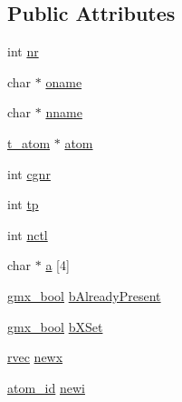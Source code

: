 \subsection*{\-Public \-Attributes}
\begin{DoxyCompactItemize}
\item 
int \hyperlink{structt__hack_ae8f9f581cfadd27c1c080470db018f08}{nr}
\item 
char $\ast$ \hyperlink{structt__hack_a2cfd4426507fdf36e0f859c3df023d4c}{oname}
\item 
char $\ast$ \hyperlink{structt__hack_a13142d44b982065f0551ee7bf6a5d6e0}{nname}
\item 
\hyperlink{structt__atom}{t\-\_\-atom} $\ast$ \hyperlink{structt__hack_a33e8bdc90cfa045a4d2c3814199b2d03}{atom}
\item 
int \hyperlink{structt__hack_a4368826e977f7724de088e1565f964e4}{cgnr}
\item 
int \hyperlink{structt__hack_a9505443c1e18327c6b2d7fa6fa2fec54}{tp}
\item 
int \hyperlink{structt__hack_ab59b7ca3a452b2557b4c95213f651b32}{nctl}
\item 
char $\ast$ \hyperlink{structt__hack_afce8a172eedc721f7a12b837e6416b10}{a} \mbox{[}4\mbox{]}
\item 
\hyperlink{include_2types_2simple_8h_a8fddad319f226e856400d190198d5151}{gmx\-\_\-bool} \hyperlink{structt__hack_a7d98cf2a2e0ca843f3aa9baba6348212}{b\-Already\-Present}
\item 
\hyperlink{include_2types_2simple_8h_a8fddad319f226e856400d190198d5151}{gmx\-\_\-bool} \hyperlink{structt__hack_a66c1218327ab2ab45c98519238831ce7}{b\-X\-Set}
\item 
\hyperlink{share_2template_2gromacs_2types_2simple_8h_aa02a552a4abd2f180c282a083dc3a999}{rvec} \hyperlink{structt__hack_a52af764e927fb76bb6237e49c59f10d2}{newx}
\item 
\hyperlink{include_2types_2simple_8h_ad3f47cdb48677e516e2049719612c737}{atom\-\_\-id} \hyperlink{structt__hack_a46d5bfb174ba965fbed42b62b2b9d1ed}{newi}
\end{DoxyCompactItemize}


